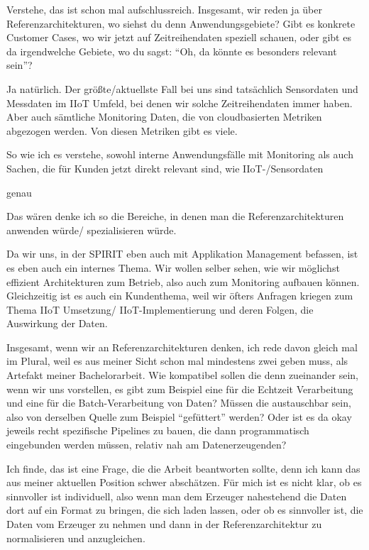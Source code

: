 \LF	 Verstehe, das ist schon mal aufschlussreich. Insgesamt, wir reden ja über Referenzarchitekturen, wo siehst du denn Anwendungsgebiete? Gibt es konkrete Customer Cases, wo wir jetzt auf Zeitreihendaten speziell schauen, oder gibt es da irgendwelche Gebiete, wo du sagst: \enquote{Oh, da könnte es besonders relevant sein}?

\PA	 Ja natürlich. Der größte/aktuellste Fall bei uns sind tatsächlich Sensordaten und Messdaten im \ac{IIoT} Umfeld, bei denen wir solche Zeitreihendaten immer haben. Aber auch sämtliche Monitoring Daten, die von cloudbasierten Metriken abgezogen werden. Von diesen Metriken gibt es viele.

\LF	So wie ich es verstehe, sowohl interne Anwendungsfälle mit Monitoring als auch Sachen, die für Kunden jetzt direkt relevant sind, wie \ac{IIoT}-/Sensordaten

\PA	 genau

\LF	 Das wären denke ich so die Bereiche, in denen man die Referenzarchitekturen anwenden würde/ spezialisieren würde.

\PA	 Da wir uns, in der SPIRIT eben auch mit Applikation Management befassen, ist es eben auch ein internes Thema. Wir wollen selber sehen, wie wir möglichst effizient Architekturen zum Betrieb, also auch zum Monitoring aufbauen können. Gleichzeitig ist es auch ein Kundenthema, weil wir öfters Anfragen kriegen zum Thema \ac{IIoT} Umsetzung/ \ac{IIoT}-Implementierung und deren Folgen, die Auswirkung der Daten.

\LF	Insgesamt, wenn wir an Referenzarchitekturen denken, ich rede davon gleich mal im Plural, weil es aus meiner Sicht schon mal mindestens zwei geben muss, als Artefakt meiner Bachelorarbeit. Wie kompatibel sollen die denn zueinander sein, wenn wir uns vorstellen, es gibt zum Beispiel eine für die Echtzeit Verarbeitung und eine für die Batch-Verarbeitung von Daten? Müssen die austauschbar sein, also von derselben Quelle zum Beispiel \enquote{gefüttert} werden? Oder ist es da okay jeweils recht spezifische Pipelines zu bauen, die  dann programmatisch eingebunden werden müssen, relativ nah am Datenerzeugenden?

\PA	 Ich finde, das ist eine Frage, die die Arbeit beantworten sollte, denn ich kann das aus meiner aktuellen Position schwer abschätzen. Für mich ist es nicht klar, ob es sinnvoller ist individuell, also wenn man dem Erzeuger nahestehend die Daten dort auf ein Format zu bringen, die sich laden lassen, oder ob es sinnvoller ist, die Daten vom Erzeuger zu nehmen und dann in der Referenzarchitektur zu normalisieren und anzugleichen.

